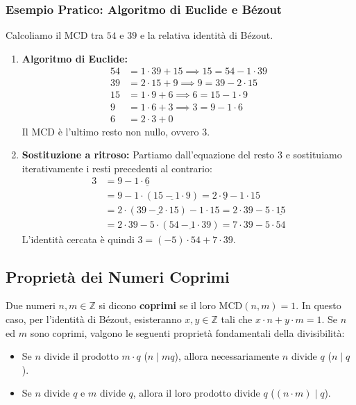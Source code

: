 \documentclass[12pt, a4paper]{article}
\begin{document}
\subsubsection*{Esempio Pratico: Algoritmo di Euclide e Bézout}
Calcoliamo il MCD tra $54$ e $39$ e la relativa identità di Bézout.
\begin{enumerate}
    \item \textbf{Algoritmo di Euclide:}
    \begin{align*}
        54 &= 1 \cdot 39 + 15 \implies 15 = 54 - 1 \cdot 39 \\
        39 &= 2 \cdot 15 + 9 \implies 9 = 39 - 2 \cdot 15 \\
        15 &= 1 \cdot 9 + 6 \implies 6 = 15 - 1 \cdot 9 \\
        9 &= 1 \cdot 6 + 3 \implies 3 = 9 - 1 \cdot 6 \\
        6 &= 2 \cdot 3 + 0
    \end{align*}
    Il MCD è l'ultimo resto non nullo, ovvero $3$.
    \item \textbf{Sostituzione a ritroso:}
    Partiamo dall'equazione del resto $3$ e sostituiamo iterativamente i resti precedenti al contrario:
    \begin{align*}
        3 &= 9 - 1 \cdot \underline{6} \\
        &= 9 - 1 \cdot (\underline{15 - 1 \cdot 9}) = 2 \cdot \underline{9} - 1 \cdot 15 \\
        &= 2 \cdot (\underline{39 - 2 \cdot 15}) - 1 \cdot 15 = 2 \cdot 39 - 5 \cdot \underline{15} \\
        &= 2 \cdot 39 - 5 \cdot (\underline{54 - 1 \cdot 39}) = 7 \cdot 39 - 5 \cdot 54
    \end{align*}
    L'identità cercata è quindi $3 = (-5) \cdot 54 + 7 \cdot 39$.
\end{enumerate}

\subsection{Proprietà dei Numeri Coprimi}
Due numeri $n, m \in \mathbb{Z}$ si dicono \textbf{coprimi} se il loro $\text{MCD}(n, m) = 1$. In questo caso, per l'identità di Bézout, esisteranno $x, y \in \mathbb{Z}$ tali che $x \cdot n + y \cdot m = 1$.
Se $n$ ed $m$ sono coprimi, valgono le seguenti proprietà fondamentali della divisibilità:
\begin{itemize}
    \item Se $n$ divide il prodotto $m \cdot q$ ($n \mid mq$), allora necessariamente $n$ divide $q$ ($n \mid q$).
    \item Se $n$ divide $q$ e $m$ divide $q$, allora il loro prodotto divide $q$ ($(n \cdot m) \mid q$).
\end{itemize}
\end{document}

